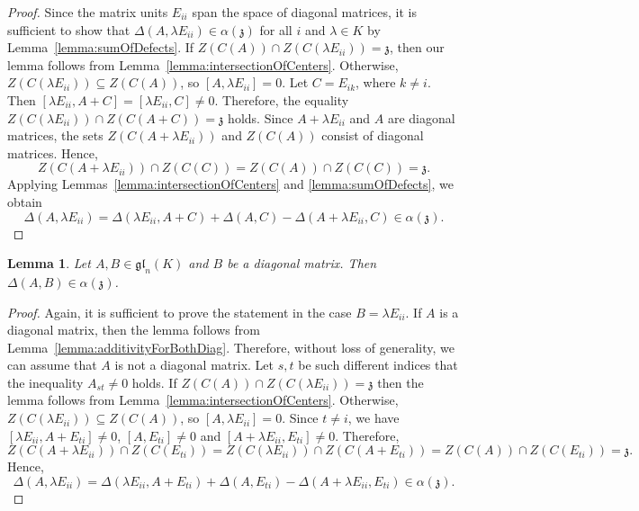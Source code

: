 \documentclass[a4paper,reqno,12pt]{amsart}
\newtheorem{lemma}[proposition]{Lemma}
\theoremstyle{definition}
\theoremstyle{remark}
\def\zzz{\mathfrak{z}}
\def\gl{\mathfrak{gl}}
\begin{document}
	\begin{proof}
		Since the matrix units $E_{ii}$ span the space of diagonal matrices, it is sufficient to show that $\Delta(A, \lambda E_{ii}) \in \alpha(\zzz)$ for all $i$ and $\lambda \in K$ by Lemma~\ref{lemma:sumOfDefects}. If $Z(C(A)) \cap Z(C(\lambda E_{ii})) = \zzz$, then our lemma follows from Lemma~\ref{lemma:intersectionOfCenters}. Otherwise, $Z(C(\lambda E_{ii})) \subseteq Z(C(A))$, so $[A, \lambda E_{ii}] = 0$. Let $C = E_{ik}$, where $k \neq i$. Then $[\lambda E_{ii}, A + C] = [\lambda E_{ii}, C] \neq 0$. Therefore, the equality $Z(C(\lambda E_{ii})) \cap Z(C(A + C)) = \zzz$ holds. Since $A + \lambda E_{ii}$ and $A$ are diagonal matrices, the sets $Z(C(A + \lambda E_{ii}))$ and $Z(C(A))$ consist of diagonal matrices. Hence,
		\begin{equation*}
			Z(C(A + \lambda E_{ii})) \cap Z(C(C)) = Z(C(A)) \cap Z(C(C)) = \zzz.
		\end{equation*}
		Applying Lemmas~\ref{lemma:intersectionOfCenters} and \ref{lemma:sumOfDefects}, we obtain
		\begin{equation*}
			\Delta(A, \lambda E_{ii}) = \Delta(\lambda E_{ii}, A + C) + \Delta(A, C) - \Delta(A + \lambda E_{ii}, C) \in \alpha(\zzz).
		\end{equation*}
	\end{proof}

	\begin{lemma}\label{lemma:almostAdditivityForDiag}
		Let $A, B \in \gl_n(K)$ and $B$ be a diagonal matrix. Then $\Delta(A, B) \in \alpha(\zzz)$.
	\end{lemma}

	\begin{proof}
		Again, it is sufficient to prove the statement in the case $B = \lambda E_{ii}$. If $A$ is a diagonal matrix, then the lemma follows from Lemma~\ref{lemma:additivityForBothDiag}. Therefore, without loss of generality, we can assume that $A$ is not a diagonal matrix. Let $s, t$ be such different indices that the inequality $A_{st} \neq 0$ holds. If $Z(C(A)) \cap Z(C(\lambda E_{ii})) = \zzz$ then the lemma follows from Lemma~\ref{lemma:intersectionOfCenters}. Otherwise, $Z(C(\lambda E_{ii})) \subseteq Z(C(A))$, so $[A, \lambda E_{ii}] = 0$. Since $t \neq i$, we have $[\lambda E_{ii}, A + E_{ti}] \neq 0$, $[A, E_{ti}] \neq 0$ and $[A + \lambda E_{ii}, E_{ti}] \neq 0$. Therefore,
		\begin{equation*}
			Z(C(A + \lambda E_{ii})) \cap Z(C(E_{ti})) = Z(C(\lambda E_{ii})) \cap Z(C(A + E_{ti})) = Z(C(A)) \cap Z(C(E_{ti})) = \zzz.
		\end{equation*}
		Hence,
		\begin{equation*}
			\Delta(A, \lambda E_{ii}) = \Delta(\lambda E_{ii}, A + E_{ti}) + \Delta(A, E_{ti}) - \Delta(A + \lambda E_{ii}, E_{ti}) \in \alpha(\zzz).
		\end{equation*}
	\end{proof}
\end{document}
